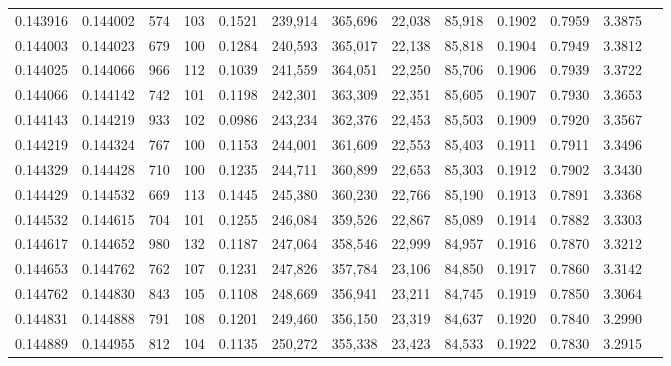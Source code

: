 \begin{tabular}{rrrrrrrrrrrrr}
0.143916 & 0.144002 &   574 & 103 &                                     0.1521 & 239,914 & 365,696 &  22,038 &  85,918 & 0.1902 & 0.7959 & 3.3875 \\
0.144003 & 0.144023 &   679 & 100 &                                     0.1284 & 240,593 & 365,017 &  22,138 &  85,818 & 0.1904 & 0.7949 & 3.3812 \\
0.144025 & 0.144066 &   966 & 112 &                                     0.1039 & 241,559 & 364,051 &  22,250 &  85,706 & 0.1906 & 0.7939 & 3.3722 \\
0.144066 & 0.144142 &   742 & 101 &                                     0.1198 & 242,301 & 363,309 &  22,351 &  85,605 & 0.1907 & 0.7930 & 3.3653 \\
0.144143 & 0.144219 &   933 & 102 &                                     0.0986 & 243,234 & 362,376 &  22,453 &  85,503 & 0.1909 & 0.7920 & 3.3567 \\
0.144219 & 0.144324 &   767 & 100 &                                     0.1153 & 244,001 & 361,609 &  22,553 &  85,403 & 0.1911 & 0.7911 & 3.3496 \\
0.144329 & 0.144428 &   710 & 100 &                                     0.1235 & 244,711 & 360,899 &  22,653 &  85,303 & 0.1912 & 0.7902 & 3.3430 \\
0.144429 & 0.144532 &   669 & 113 &                                     0.1445 & 245,380 & 360,230 &  22,766 &  85,190 & 0.1913 & 0.7891 & 3.3368 \\
0.144532 & 0.144615 &   704 & 101 &                                     0.1255 & 246,084 & 359,526 &  22,867 &  85,089 & 0.1914 & 0.7882 & 3.3303 \\
0.144617 & 0.144652 &   980 & 132 &                                     0.1187 & 247,064 & 358,546 &  22,999 &  84,957 & 0.1916 & 0.7870 & 3.3212 \\
0.144653 & 0.144762 &   762 & 107 &                                     0.1231 & 247,826 & 357,784 &  23,106 &  84,850 & 0.1917 & 0.7860 & 3.3142 \\
0.144762 & 0.144830 &   843 & 105 &                                     0.1108 & 248,669 & 356,941 &  23,211 &  84,745 & 0.1919 & 0.7850 & 3.3064 \\
0.144831 & 0.144888 &   791 & 108 &                                     0.1201 & 249,460 & 356,150 &  23,319 &  84,637 & 0.1920 & 0.7840 & 3.2990 \\
0.144889 & 0.144955 &   812 & 104 &                                     0.1135 & 250,272 & 355,338 &  23,423 &  84,533 & 0.1922 & 0.7830 & 3.2915 \\

\end{tabular}
